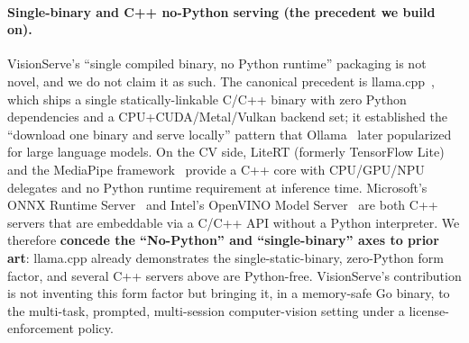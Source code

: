 \paragraph{Single-binary and C++ no-Python serving (the precedent we build on).}
VisionServe's ``single compiled binary, no Python runtime'' packaging is
not novel, and we do not claim it as such. The canonical precedent is
llama.cpp~\cite{llamacpp}, which ships a single statically-linkable C/C++
binary with zero Python dependencies and a CPU+CUDA/Metal/Vulkan backend set;
it established the ``download one binary and serve locally'' pattern that
Ollama~\cite{ollama2023} later popularized for large language models.
On the CV side, LiteRT (formerly TensorFlow Lite) and the MediaPipe
framework~\cite{litert} provide a C++ core with CPU/GPU/NPU delegates and no
Python runtime requirement at inference time.
Microsoft's ONNX Runtime Server~\cite{ortserver} and Intel's OpenVINO Model
Server~\cite{openvinoms} are both C++ servers that are embeddable via a C/C++
API without a Python interpreter.
We therefore \textbf{concede the ``No-Python'' and ``single-binary''
axes to prior art}: llama.cpp already demonstrates the single-static-binary,
zero-Python form factor, and several C++ servers above are Python-free.
VisionServe's contribution is not inventing this form factor but bringing it,
in a memory-safe Go binary, to the multi-task, prompted, multi-session
computer-vision setting under a license-enforcement policy.

